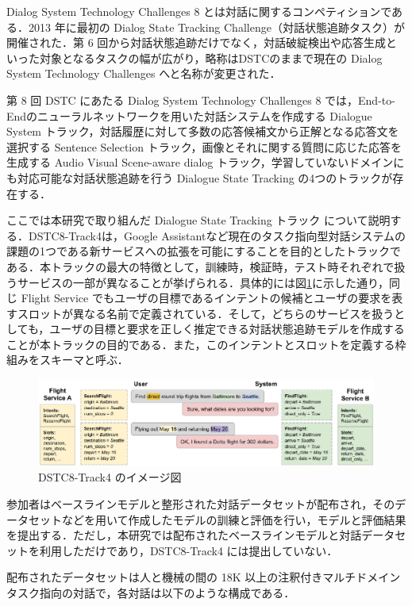 Dialog System Technology Challenges 8 \cite{dstc8}とは対話に関するコンペティションである．2013 年に最初の Dialog State Tracking Challenge（対話状態追跡タスク）が開催された．第 6 回から対話状態追跡だけでなく，対話破綻検出や応答生成といった対象となるタスクの幅が広がり，略称はDSTCのままで現在の Dialog System Technology Challenges へと名称が変更された．\par
第 8 回 DSTC にあたる Dialog System Technology Challenges 8 では，End-to-Endのニューラルネットワークを用いた対話システムを作成する Dialogue System トラック，対話履歴に対して多数の応答候補文から正解となる応答文を選択する Sentence Selection トラック，画像とそれに関する質問に応じた応答を生成する Audio Visual Scene-aware dialog トラック，学習していないドメインにも対応可能な対話状態追跡を行う Dialogue State Tracking の4つのトラックが存在する．\par
ここでは本研究で取り組んだ Dialogue State Tracking トラック について説明する．DSTC8-Track4は，Google Assistantなど現在のタスク指向型対話システムの課題の1つである新サービスへの拡張を可能にすることを目的としたトラックである．本トラックの最大の特徴として，訓練時，検証時，テスト時それぞれで扱うサービスの一部が異なることが挙げられる．具体的には図\ref{fig:dstc8-track4}に示した通り，同じ Flight Service でもユーザの目標であるインテントの候補とユーザの要求を表すスロットが異なる名前で定義されている．そして，どちらのサービスを扱うとしても，ユーザの目標と要求を正しく推定できる対話状態追跡モデルを作成することが本トラックの目的である．また，このインテントとスロットを定義する枠組みをスキーマと呼ぶ．\par 
\begin{figure}[tbh]
    \centering
    \includegraphics[width=15cm]{chapter2/dstc8-track4.eps}
    \caption{DSTC8-Track4 のイメージ図}
    \label{fig:dstc8-track4}
\end{figure}
参加者はベースラインモデルと整形された対話データセットが配布され，そのデータセットなどを用いて作成したモデルの訓練と評価を行い，モデルと評価結果を提出する．ただし，本研究では配布されたベースラインモデルと対話データセットを利用しただけであり，DSTC8-Track4 には提出していない．\par 
配布されたデータセットは人と機械の間の 18K 以上の注釈付きマルチドメインタスク指向の対話で，各対話は以下のような構成である．

